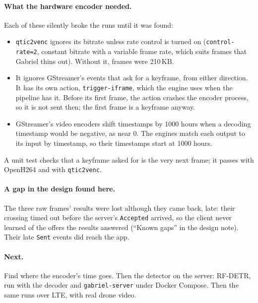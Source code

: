 \documentclass[11pt]{article}
\newcommand{\code}[1]{\texttt{#1}}
\begin{document}
\paragraph{What the hardware encoder needed.} Each of these silently
broke the runs until it was found:
\begin{itemize}[nosep]
  \item \code{qtic2venc} ignores its bitrate unless rate control is turned
        on (\code{control-rate=2}, constant bitrate with a variable frame
        rate, which suits frames that Gabriel thins out). Without it, frames
        were 210\,KB.
  \item It ignores GStreamer's events that ask for a keyframe, from either
        direction. It has its own action, \code{trigger-iframe}, which the
        engine uses when the pipeline has it. Before its first frame, the
        action crashes the encoder process, so it is not sent then; the first
        frame is a keyframe anyway.
  \item GStreamer's video encoders shift timestamps by 1000 hours when a
        decoding timestamp would be negative, as near 0. The engines match
        each output to its input by timestamp, so their timestamps start at
        1000 hours.
\end{itemize}
A unit test checks that a keyframe asked for is the very next frame; it passes
with OpenH264 and with \code{qtic2venc}.

\paragraph{A gap in the design found here.} The three raw frames' results were
lost although they came back, late: their crossing timed out before the
server's \code{Accepted} arrived, so the client never learned of the offers
the results answered (``Known gaps'' in the design note). Their late
\code{Sent} events did reach the app.

\paragraph{Next.} Find where the encoder's time goes. Then the detector on the
server: RF-DETR, run with the decoder and \code{gabriel-server} under Docker
Compose. Then the same runs over LTE, with real drone video.
\end{document}
